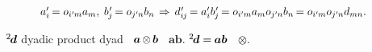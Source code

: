 \nopagebreak\vspace{-0.3em}\begin{equation*}
\scalebox{0.96}[1]{$
a'_i \hspace{-0.2ex} = \cosinematrix{i'\hspace{-0.1ex}m} a_m
, \;
b\kern+0.1ex'_{\hspace{-0.2ex}j} \hspace{-0.2ex} = \cosinematrix{j'\hspace{-0.1ex}n} b_n
\hspace{-0.2ex} \:\Rightarrow\: \hspace{-0.1ex}
d\kern+0.1ex'_{\hspace{-0.1ex}i\hspace{-0.1ex}j} \hspace{-0.2ex} = a'_i b\kern+0.1ex'_{\hspace{-0.2ex}j} \hspace{-0.2ex}
= \cosinematrix{i'\hspace{-0.1ex}m} a_m \cosinematrix{j'\hspace{-0.1ex}n} b_n \hspace{-0.2ex}
= \cosinematrix{i'\hspace{-0.1ex}m} \cosinematrix{j'\hspace{-0.1ex}n} d_{mn}
$} .
\end{equation*}

\vspace{-0.25em} \noindent {} ~${^2\hspace{-0.25ex}\bm{d}}$
 dyadic product\ru{)}   dyad\ru{)}
 ~${\bm{a} \hspace{-0.15ex} \otimes \hspace{-0.15ex} \bm{b}}$ ~${\bm{a} \bm{b}}$.
 ${^2\hspace{-0.25ex}\bm{d} = \hspace{-0.1ex} \bm{a} \bm{b}}$  ~${\otimes}$.


